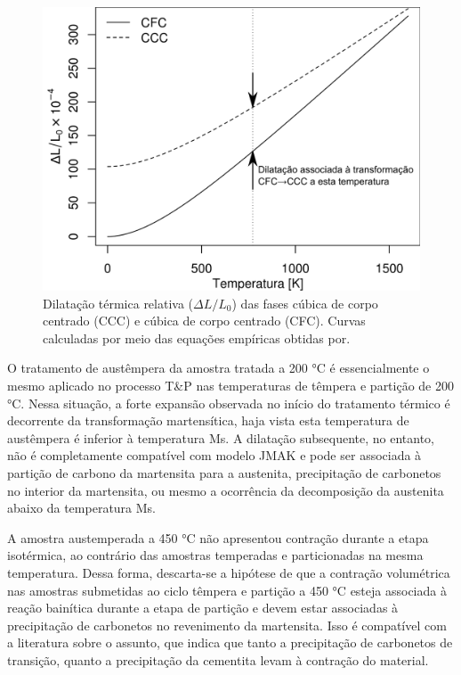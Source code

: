 \begin{figure}
	\includegraphics[width=12cm]{img/dilation_alphagamma.pdf}
	\caption{Dilatação térmica relativa ($\Delta L/L_0$) das fases cúbica de corpo centrado (CCC) e cúbica de corpo centrado (CFC). Curvas calculadas por meio das equações empíricas obtidas por\cite{VanBohemen2013b}.}
	\label{fig:dilRel}
\end{figure}

O tratamento de austêmpera da amostra tratada a 200 °C é essencialmente o mesmo aplicado no processo T\&P nas temperaturas de têmpera e partição de 200 °C. Nessa situação, a forte expansão observada no início do tratamento térmico é decorrente da transformação martensítica, haja vista esta temperatura de austêmpera é inferior à temperatura Ms. A dilatação subsequente, no entanto, não é completamente compatível com modelo JMAK e pode ser associada à partição de carbono da martensita para a austenita, precipitação de carbonetos no interior da martensita, ou mesmo a ocorrência da decomposição da austenita abaixo da temperatura Ms.

A amostra austemperada a 450 °C não apresentou contração durante a etapa isotérmica, ao contrário das amostras temperadas e particionadas na mesma temperatura. Dessa forma, descarta-se a hipótese de que a contração volumétrica nas amostras submetidas ao ciclo têmpera e partição a 450 °C esteja associada à reação bainítica durante a etapa de partição e devem estar associadas à precipitação de carbonetos no revenimento da martensita. Isso é compatível com a literatura sobre o assunto, que indica que tanto a precipitação de carbonetos de transição, quanto a precipitação da cementita levam à contração do material\cite{Morra2001}.

